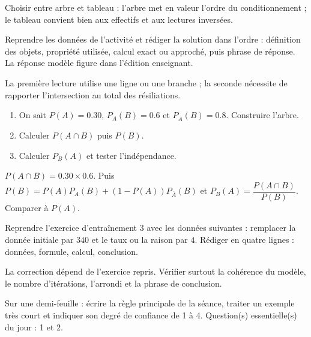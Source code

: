 \begin{summary}Choisir entre arbre et tableau : l'arbre met en valeur l'ordre du conditionnement ; le tableau convient bien aux effectifs et aux lectures inversées.\end{summary}

\begin{example}
Reprendre les données de l'activité et rédiger la solution dans l'ordre : définition des objets, propriété utilisée, calcul exact ou approché, puis phrase de réponse. La réponse modèle figure dans l'édition enseignant.
\end{example}
\begin{solution}La première lecture utilise une ligne ou une branche ; la seconde nécessite de rapporter l'intersection au total des résiliations.\end{solution}

\begin{exercise}[essentiel]
\begin{enumerate}\item On sait $P(A)=\num{0,30}$, $P_A(B)=\num{0,6}$ et $P_{\overline A}(B)=\num{0,8}$. Construire l'arbre.\item Calculer $P(A\cap B)$ puis $P(B)$.\item Calculer $P_B(A)$ et tester l'indépendance.\end{enumerate}
\end{exercise}
\begin{solution}$P(A\cap B)=\num{0,30}\times\num{0,6}$. Puis $P(B)=P(A)P_A(B)+(1-P(A))P_{\overline A}(B)$ et $P_B(A)=\dfrac{P(A\cap B)}{P(B)}$. Comparer à $P(A)$.\end{solution}


\begin{homework}Reprendre l'exercice d'entraînement 3 avec les données suivantes : remplacer la donnée initiale par $340$ et le taux ou la raison par $4$. Rédiger en quatre lignes : données, formule, calcul, conclusion.\end{homework}
\begin{solution}La correction dépend de l'exercice repris. Vérifier surtout la cohérence du modèle, le nombre d'itérations, l'arrondi et la phrase de conclusion.\end{solution}

\begin{exitticket}[3 minutes]Sur une demi-feuille : écrire la règle principale de la séance, traiter un exemple très court et indiquer son degré de confiance de 1 à 4. Question(s) essentielle(s) du jour : 1 et 2.\end{exitticket}

